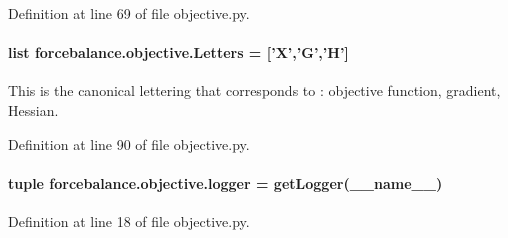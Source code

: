 Definition at line 69 of file objective.\-py.

\hypertarget{namespaceforcebalance_1_1objective_a89a971322532b36852765b2680651f1f}{
\paragraph[{Letters}]{\setlength{\rightskip}{0pt plus 5cm}list forcebalance.\-objective.\-Letters = \mbox{[}'X','G','H'\mbox{]}}}\label{namespaceforcebalance_1_1objective_a89a971322532b36852765b2680651f1f}


This is the canonical lettering that corresponds to \-: objective function, gradient, Hessian. 



Definition at line 90 of file objective.\-py.

\hypertarget{namespaceforcebalance_1_1objective_ac2e1e8c9612652836168e5cdde77b6e7}{
\paragraph[{logger}]{\setlength{\rightskip}{0pt plus 5cm}tuple forcebalance.\-objective.\-logger = get\-Logger(\-\_\-\-\_\-name\-\_\-\-\_\-)}}\label{namespaceforcebalance_1_1objective_ac2e1e8c9612652836168e5cdde77b6e7}


Definition at line 18 of file objective.\-py.

